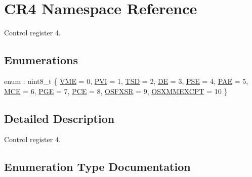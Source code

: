 \hypertarget{namespace_c_r4}{}\section{C\+R4 Namespace Reference}
\label{namespace_c_r4}


Control register 4.  


\subsection*{Enumerations}
\begin{DoxyCompactItemize}
\item 
enum \+: uint8\+\_\+t \{ \newline
\hyperlink{namespace_c_r4_a2928f19d113bac6aaeab713b170185ceaa569bc9b3252f731550182a03c650797}{V\+ME} = 0, 
\hyperlink{namespace_c_r4_a2928f19d113bac6aaeab713b170185cea6b65c8f982880d05c6a32200c60242db}{P\+VI} = 1, 
\hyperlink{namespace_c_r4_a2928f19d113bac6aaeab713b170185ceace0ed188ba0369731b44b7df079a518b}{T\+SD} = 2, 
\hyperlink{namespace_c_r4_a2928f19d113bac6aaeab713b170185cea6ba0a01eeee81d3b2b4165a5084b507a}{DE} = 3, 
\newline
\hyperlink{namespace_c_r4_a2928f19d113bac6aaeab713b170185ceaf62a80eb9fee090b45e3962ca9adb6cd}{P\+SE} = 4, 
\hyperlink{namespace_c_r4_a2928f19d113bac6aaeab713b170185cea3a3afec51c05f51090a3d704d31ff310}{P\+AE} = 5, 
\hyperlink{namespace_c_r4_a2928f19d113bac6aaeab713b170185ceab6bdf44cebbecb78a845af15d91a1d0a}{M\+CE} = 6, 
\hyperlink{namespace_c_r4_a2928f19d113bac6aaeab713b170185ceadef854f9df515146e4f5c5b7c46206ee}{P\+GE} = 7, 
\newline
\hyperlink{namespace_c_r4_a2928f19d113bac6aaeab713b170185ceafd06ff4443c1659425fefcc65fc76419}{P\+CE} = 8, 
\hyperlink{namespace_c_r4_a2928f19d113bac6aaeab713b170185ceab0cf978bb5b8c32070363ab81d327c53}{O\+S\+F\+X\+SR} = 9, 
\hyperlink{namespace_c_r4_a2928f19d113bac6aaeab713b170185ceabb68ec0930317011b84484346947f472}{O\+S\+X\+M\+M\+E\+X\+C\+PT} = 10
 \}
\end{DoxyCompactItemize}


\subsection{Detailed Description}
Control register 4. 

\subsection{Enumeration Type Documentation}
\mbox{\label{namespace_c_r4_a2928f19d113bac6aaeab713b170185ce}} 
